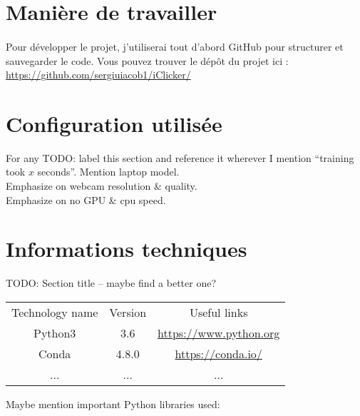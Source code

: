 \section{Manière de travailler}
\paragraph{}
Pour développer le projet, j'utiliserai tout d'abord GitHub pour structurer et sauvegarder le code.
Vous pouvez trouver le dépôt du projet ici : \href{https://github.com/sergiuiacob1/iClicker/}{https://github.com/sergiuiacob1/iClicker/}
\paragraph{}

\section{Configuration utilisée}
For any 
TODO: label this section and reference it wherever I mention ``training took $x$ seconds''.
Mention laptop model.\\
Emphasize on webcam resolution \& quality.\\
Emphasize on no GPU \& cpu speed.\\

\section{Informations techniques}
TODO: Section title – maybe find a better one?

\begin{center}
    \label{technologies-used}
    \begin{tabular}{ c c c }
        Technology name & Version & Useful links \\
        Python3 & 3.6 & \url{https://www.python.org} \\
        Conda & 4.8.0 & \url{https://conda.io/} \\
        ... & ... & ...
    \end{tabular}
\end{center}

Maybe mention important Python libraries used:\\

